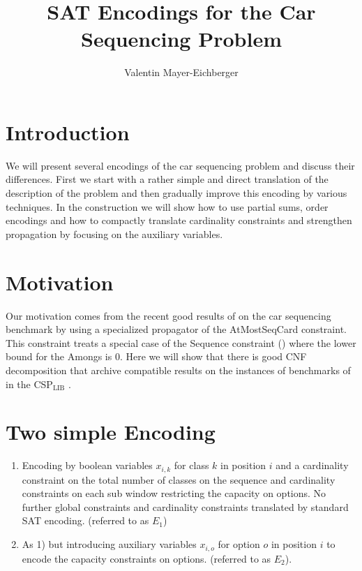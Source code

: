 \documentclass[]{llncs}
\author{Valentin Mayer-Eichberger}
\institute{NICTA \\ University of New South Wales \\
\email{valentin.mayer-eichberger@nicta.com.au}}
\title{SAT Encodings for the Car Sequencing Problem}
\newcommand{\AtMostSeqCard}{AtMostSeqCard }
\begin{document}
 \maketitle

\section{Introduction}

We will present several encodings of the car sequencing problem and
discuss their differences. First we start with a rather simple and
direct translation of the description of the problem and then gradually
improve this encoding by various techniques. In the construction we will
show how to use partial sums, order encodings and how to compactly
translate cardinality constraints and strengthen propagation by focusing
on the auxiliary variables. 

\section{Motivation}

Our motivation comes from the recent good results of \cite{Siala12} on
the car sequencing benchmark by using a specialized propagator of the
\AtMostSeqCard constraint. This constraint treats a special case of the
Sequence constraint (\cite{Hoeve06}) where the lower bound for the
Amongs is $0$.  Here we will show that there is good  CNF decomposition
that archive compatible results on the instances of benchmarks of in the
CSP$_{\mbox{LIB}}$ \cite{Gent99}. 

\section{Two simple Encoding}

\begin{enumerate}
    \item Encoding by boolean variables $x_{i,k}$ for class $k$ in
        position $i$ and a cardinality constraint on the total number of
        classes on the sequence and cardinality constraints on each sub
        window restricting the capacity on options. No further global
        constraints and cardinality constraints translated by standard
        SAT encoding. (referred to as $E_1$)
    \item As 1) but introducing auxiliary variables $x_{i,o}$ for option
        $o$ in position $i$ to encode the capacity constraints on options.
        (referred to as $E_2$). 
\end{enumerate}
\end{document}
